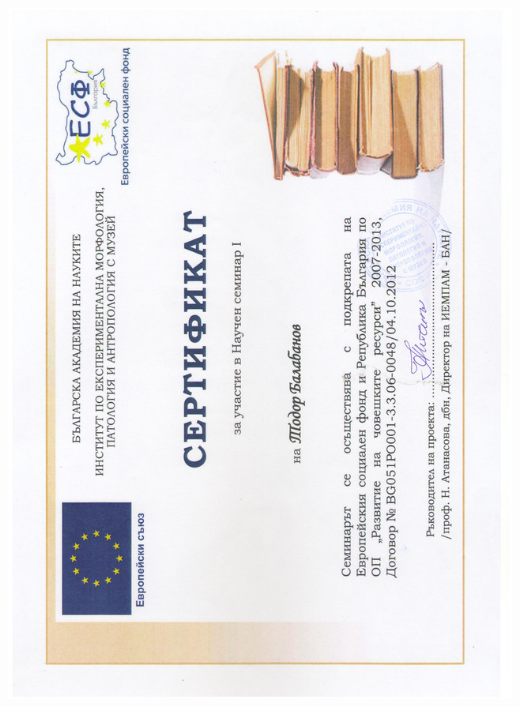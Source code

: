 \documentclass[bulgarian,a4paper]{europasscv}
\begin{document}
\includegraphics[width=\textwidth,height=\textheight,keepaspectratio]{IEMPAM2013_1}
\end{document}
